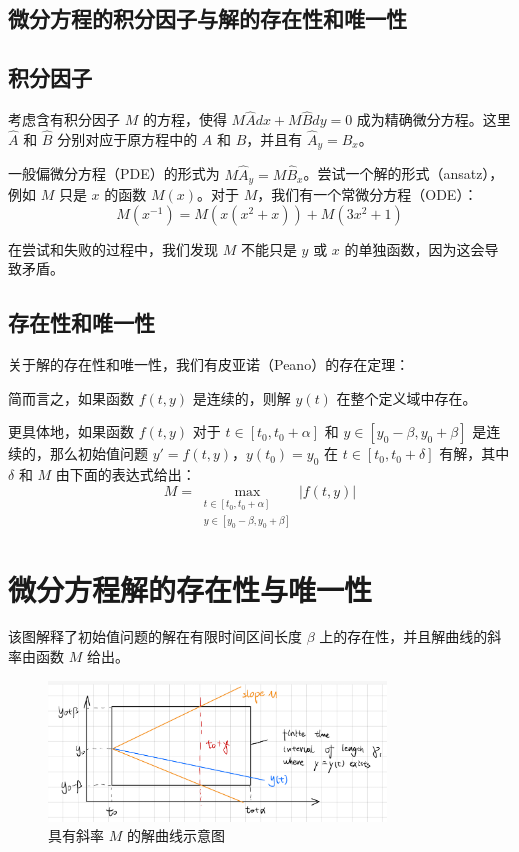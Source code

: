 \documentclass{ctexart}
\begin{document}
\subsection*{微分方程的积分因子与解的存在性和唯一性}

\subsection*{积分因子}
考虑含有积分因子 \( M \) 的方程，使得 \( M\hat{A}dx + M\hat{B}dy = 0 \) 成为精确微分方程。这里 \( \hat{A} \) 和 \( \hat{B} \) 分别对应于原方程中的 \( A \) 和 \( B \)，并且有 \( \hat{A}_y = \hat{B}_x \)。

一般偏微分方程（PDE）的形式为 \( M\hat{A}_y = M\hat{B}_x \)。尝试一个解的形式（ansatz），例如 \( M \) 只是 \( x \) 的函数 \( M(x) \)。对于 \( M \)，我们有一个常微分方程（ODE）：
\[
M(x^{-1}) = M(x(x^2 + x)) + M(3x^2 + 1)
\]

在尝试和失败的过程中，我们发现 \( M \) 不能只是 \( y \) 或 \( x \) 的单独函数，因为这会导致矛盾。

\subsection*{存在性和唯一性}
关于解的存在性和唯一性，我们有皮亚诺（Peano）的存在定理：

简而言之，如果函数 \( f(t,y) \) 是连续的，则解 \( y(t) \) 在整个定义域中存在。

更具体地，如果函数 \( f(t,y) \) 对于 \( t \in [t_0, t_0 + \alpha] \) 和 \( y \in [y_0 - \beta, y_0 + \beta] \) 是连续的，那么初始值问题 \( y' = f(t,y) \)，\( y(t_0) = y_0 \) 在 \( t \in [t_0, t_0 + \delta] \) 有解，其中 \( \delta \) 和 \( M \) 由下面的表达式给出：
\[
M = \max_{\substack{t \in [t_0,t_0+\alpha] \\ y \in [y_0-\beta,y_0+\beta]}} |f(t,y)|
\]



\section*{微分方程解的存在性与唯一性}

该图解释了初始值问题的解在有限时间区间长度 \( \beta \) 上的存在性，并且解曲线的斜率由函数 \( M \) 给出。

\begin{figure}[h]
\centering
\includegraphics[width=0.8\textwidth]{image.png}
\caption{具有斜率 \( M \) 的解曲线示意图}
\end{figure}
\end{document}
